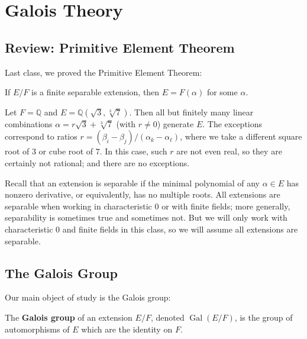 

\section{Galois Theory}

\subsection{Review: Primitive Element Theorem}

Last class, we proved the Primitive Element Theorem:

\begin{theorem}
    If $E/F$ is a finite separable extension, then $E = F(\alpha)$ for some $\alpha$. 
\end{theorem}


\begin{example}
    Let $F = \mathbb{Q}$ and $E = \mathbb{Q}(\sqrt{3}, \sqrt[3]{7})$. Then all but finitely many linear combinations $\alpha = r\sqrt{3} + \sqrt[3]{7}$ (with $r \neq 0$) generate $E$. The exceptions correspond to ratios $r = (\beta_i - \beta_j)/(\alpha_k - \alpha_\ell)$, where we take a different square root of $3$ or cube root of $7$. In this case, such $r$ are not even real, so they are certainly not rational; and there are no exceptions.
\end{example}

Recall that an extension is separable if the minimal polynomial of any $\alpha \in E$ has nonzero derivative, or equivalently, has no multiple roots. All extensions are separable when working in characteristic $0$ or with finite fields; more generally, separability is sometimes true and sometimes not. But we will only work with characteristic $0$ and finite fields in this class, so we will assume all extensions are separable. 


\subsection{The Galois Group}

Our main object of study is the Galois group:

\begin{definition}
    The \textbf{Galois group} of an extension $E/F$, denoted $\operatorname{Gal}(E/F)$, is the group of automorphisms of $E$ which are the identity on $F$. 
\end{definition}

